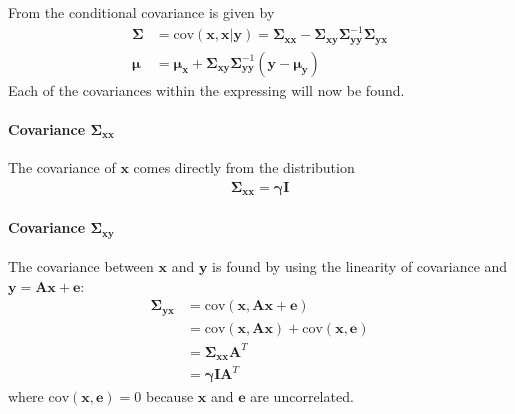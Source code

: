 From \cite{conditional} the conditional covariance is given by
\begin{align*}
\boldsymbol{\Sigma} &= \text{cov}(\mathbf{x} , \mathbf{x} \vert \mathbf{y}) = \boldsymbol{\Sigma}_{\mathbf{xx}} - \boldsymbol{\Sigma}_{\mathbf{xy}} \boldsymbol{\Sigma}_{\mathbf{yy}}^{-1} \boldsymbol{\Sigma}_{\mathbf{yx}} \\
\boldsymbol{\mu} &= \boldsymbol{\mu}_{\mathbf{x}} + \boldsymbol{\Sigma}_{\mathbf{xy}} \boldsymbol{\Sigma}_{\mathbf{yy}}^{-1} (\mathbf{y} - \boldsymbol{\mu}_{\mathbf{y}})
\end{align*}
Each of the covariances within the expressing will now be found.

\paragraph{Covariance $\boldsymbol{\Sigma}_{\mathbf{xx}}$}
The covariance of $\mathbf{x}$ comes directly from the distribution  
\begin{align*}
\boldsymbol{\Sigma}_{\mathbf{xx}} = \boldsymbol{\gamma} \mathbf{I}
\end{align*} 

\paragraph{Covariance $\boldsymbol{\Sigma}_{\mathbf{xy}}$}
The covariance between $\mathbf{x}$ and $\mathbf{y}$ is found by using the linearity of covariance and $\mathbf{y} = \mathbf{Ax} + \mathbf{e}$:
\begin{align*}
\boldsymbol{\Sigma}_{\mathbf{yx}} &= \text{cov} \left(\mathbf{x} , \mathbf{Ax} + \mathbf{e} \right) \\ 
&= \text{cov} \left(\mathbf{x} , \mathbf{Ax} \right) + \text{cov} \left(\mathbf{x} , \mathbf{e} \right) \\
&= \boldsymbol{\Sigma}_{\mathbf{xx}} \mathbf{A}^T \\
&= \boldsymbol{\gamma} \mathbf{I} \mathbf{A}^T
\end{align*}
where $\text{cov} \left(\mathbf{x} , \mathbf{e} \right) = 0$ because $\textbf{x}$ and $\textbf{e}$ are uncorrelated.

